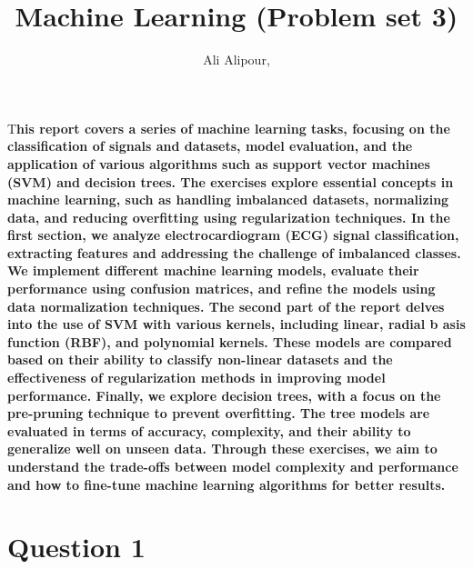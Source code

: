 \documentclass[DIV=calc, paper=a4, fontsize=11pt, twocolumn]{scrartcl}	 %
\title{Machine Learning (Problem set 3)} %
\author{Ali Alipour, } %
\date{} %
\newcommand{\initial}[1]{ %
\lettrine[lines=3,lhang=0.3,nindent=0em]{
\color{DarkGoldenrod}
{\textsf{#1}}}{}}
\begin{document}
\maketitle %

\thispagestyle{fancy} %


\initial{T}\textbf{his report covers a series of machine learning tasks, focusing on the classification of signals and 
                   datasets, model evaluation, and the application of various algorithms such as support vector machines 
                   (SVM) and decision trees. The exercises explore essential concepts in machine learning, such as handling 
                   imbalanced datasets, normalizing data, and reducing overfitting using regularization techniques.
                   In the first section, we analyze electrocardiogram (ECG) signal classification, extracting features and 
                   addressing the challenge of imbalanced classes. We implement different machine learning models, evaluate 
                   their performance using confusion matrices, and refine the models using data normalization techniques.
                   The second part of the report delves into the use of SVM with various kernels, including linear, radial b
                   asis function (RBF), and polynomial kernels. These models are compared based on their ability to classify 
                   non-linear datasets and the effectiveness of regularization methods in improving model performance.
                   Finally, we explore decision trees, with a focus on the pre-pruning technique to prevent overfitting. 
                   The tree models are evaluated in terms of accuracy, complexity, and their ability to generalize well on 
                   unseen data. Through these exercises, we aim to understand the trade-offs between model complexity and 
                   performance and how to fine-tune machine learning algorithms for better results.}

\section*{\small{Question 1}}
\end{document}
